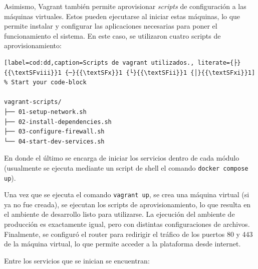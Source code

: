 Asimismo, Vagrant también permite aprovisionar \textit{scripts} de configuración a las máquinas virtuales. Estos pueden ejecutarse al iniciar estas máquinas, lo que permite instalar y configurar las aplicaciones necesarias para poner el funcionamiento el sistema. En este caso, se utilizaron cuatro scripts de aprovisionamiento:

\begin{lstlisting}[label=cod:dd,caption=Scripts de vagrant utilizados., literate={├}{{\textSFviii}}1 {─}{{\textSFx}}1 {└}{{\textSFii}}1 {│}{{\textSFxi}}1]  % Start your code-block

vagrant-scripts/
├── 01-setup-network.sh
├── 02-install-dependencies.sh
├── 03-configure-firewall.sh
└── 04-start-dev-services.sh

\end{lstlisting}

En donde el último se encarga de iniciar los servicios dentro de cada módulo (usualmente se ejecuta mediante un script de shell el comando \lstinline[language=sh]|docker compose up|).

Una vez que se ejecuta el comando \lstinline[language=sh]|vagrant up|, se crea una máquina virtual (si ya no fue creada), se ejecutan los scripts de aprovisionamiento, lo que resulta en el ambiente de desarrollo listo para utilizarse. La ejecución del ambiente de producción es exactamente igual, pero con distintas configuraciones de archivos. Finalmente, se configuró el router para redirigir el tráfico de los puertos 80 y 443 de la máquina virtual, lo que permite acceder a la plataforma desde internet.

Entre los servicios que se inician se encuentran:

